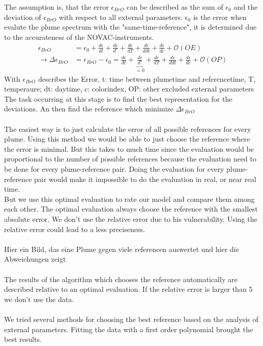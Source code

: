 \documentclass  [
  paper    = a4,
  BCOR     = 10mm,
  twoside,
  fontsize = 12pt,
  fleqn,
  toc      = bibnumbered,
  toc      = listofnumbered,
  numbers  = noendperiod,
  headings = normal,
  listof   = leveldown,
  version  = 3.03
]                                       {scrreprt}
\begin{document}
	The assumption is, that the  error $\epsilon_{BrO}$ can be described as the sum of $\epsilon_{0}$ and the deviation of $\epsilon_{BrO}$ with respect to all external parameters. $\epsilon_{0}$ is the  error when evalute the plume spectrum with the "same-time-reference", it is determined due to the accurateness of the NOVAC-instruments.
	\begin{align}
		\epsilon_{BrO} &=  \epsilon_{0}+\frac{d\epsilon}{dt}+\frac{d\epsilon}{d ^{\circ}}+\frac{d\epsilon}{dT}+\frac{d\epsilon}{ddt} +\frac{d\epsilon}{dc} + \mathcal{O}\left(OE\right) \\
		\rightarrow \Delta \epsilon_{BrO} &= \epsilon_{BrO} - \epsilon_{0} =\frac{d\epsilon}{dt}+\underbrace{\frac{d\epsilon}{d ^{\circ}}}_{=0}+\frac{d\epsilon}{dT}+\frac{d\epsilon}{ddt} +\frac{d\epsilon}{dc} + \mathcal{O}\left(OP\right) 
		\label{calc:err}
	\end{align}
	With $\epsilon_{BrO}$ describes the  Error, t: time between plumetime and referencetime, T, temperaure; dt: daytime, c: colorindex, OP: other excluded external parameters\\
	The task occurring at this stage is to find the best representation for the deviations. An then find the reference which minimize $\Delta \epsilon_{BrO} $\\
	\\
	The easiest way is to just calculate the  error of all possible references for every plume. Using this method we would be able to just choose the reference where the  error is minimal. But this takes to much time since the evaluation would be proportional to the number of possible references because the evaluation need to be done for every plume-reference pair. Doing the evaluation for every plume-reference pair would make it impossible to do the evaluation in real, or near real time.\\
	But we use this optimal evaluation to rate our model and compare them among each other. The optimal evaluation always choose the reference with the smallest absolute error. We don't use the relative error due to his vulnerability. Using the relative error could lead to a less preciseness.\\
	\\
	Hier ein Bild, das eine Plume gegen viele referencen auswertet und hier die Abweichungen zeigt\\
	\\
	The results of the algorithm which chooses the reference automatically are described relative to an optimal evaluation. If the relative error is larger than 5 we don't use the data.\\
	\\
	We tried several methods for choosing the best reference based on the analysis of external parameters. Fitting the data with a first order polynomial brought the best results.
	
\end{document}
